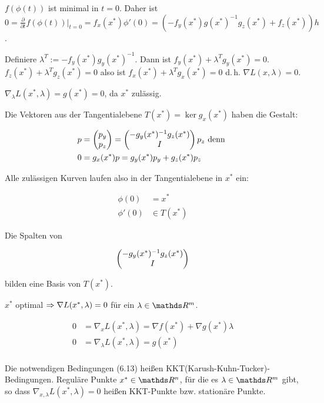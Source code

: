 $f(\phi(t))$ ist minimal in $t=0$. Daher ist $0 = \frac{\partial}{\partial t} f(\phi(t))|_{t=0} = f_x(x^*) \phi'(0) = (-f_y(x^*) g(x^*)^{-1} g_z(x^*) + f_z(x^*))h$.

Definiere $\lambda^T := -f_y(x^*)g_y(x^*)^{-1}$. Dann ist $f_y(x^*) + \lambda^T g_y(x^*) = 0$. $f_z(x^*) + \lambda^T g_z(x^*) = 0$ also ist $f_x(x^*) + \lambda^T g_x(x^*) = 0$ d.\,h. $\nabla L(x,\lambda)=0$.

$\nabla_\lambda L(x^*,\lambda) = g(x^*) = 0$, da $x^*$ zulässig.


Die Vektoren aus der Tangentialebene $T(x^*) = \ker g_x(x^*)$ haben die Gestalt:

\begin{align*}
p &= \begin{pmatrix} p_y \\ p_z \end{pmatrix} = \begin{pmatrix} -g_y(x^*)^{-1} g_z(x^*) \\ I \end{pmatrix} p_z \text{ denn } \\
0 &= g_x(x^*)p = g_y(x^*)p_y + g_z(x^*) p_z \\
\end{align*}

Alle zulässigen Kurven laufen also in der Tangentialebene in $x^*$ ein:

\begin{align*}
\phi(0) &= x^* \\
\phi'(0) &\in T(x^*)
\end{align*}

Die Spalten von

\[ \begin{pmatrix} -g_y(x^*)^{-1} g_z(x^*) \\ I \end{pmatrix} \]

bilden eine Basis von $T(x^*)$.


$x^*$ optimal $\Rightarrow \nabla L(x^*,\lambda) = 0$ für ein $\lambda \in \R^m$.

\begin{align*}
0 &= \nabla_x L(x^*,\lambda) = \nabla f(x^*) + \nabla g(x^*) \lambda \\
0 &= \nabla_\lambda L(x^*, \lambda) = g(x^*) \\
\end{align*}


Die notwendigen Bedingungen (6.13) heißen KKT(Karush-Kuhn-Tucker)-Bedingungen. Reguläre Punkte $x^* \in \R^n$, für die es $\lambda \in \R^m$ gibt, so dass $\nabla_{x,\lambda} L(x^*, \lambda) = 0$ heißen KKT-Punkte bzw. stationäre Punkte.

